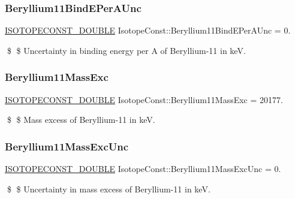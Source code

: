 \subsubsection{\texorpdfstring{Beryllium11\+Bind\+E\+Per\+A\+Unc}{Beryllium11BindEPerAUnc}}
{\footnotesize\ttfamily \mbox{\hyperlink{group___isotope_const-_macros_ga8f45a7272ce02c0b4c65c44636ed719a}{I\+S\+O\+T\+O\+P\+E\+C\+O\+N\+S\+T\+\_\+\+D\+O\+U\+B\+LE}} Isotope\+Const\+::\+Beryllium11\+Bind\+E\+Per\+A\+Unc = 0.}

\$ \$ Uncertainty in binding energy per A of Beryllium-\/11 in keV. \mbox{\label{group___isotope_const-_beryllium-_be11_ga4ae464d79a430e2e596828de55b8603c}} 
\subsubsection{\texorpdfstring{Beryllium11\+Mass\+Exc}{Beryllium11MassExc}}
{\footnotesize\ttfamily \mbox{\hyperlink{group___isotope_const-_macros_ga8f45a7272ce02c0b4c65c44636ed719a}{I\+S\+O\+T\+O\+P\+E\+C\+O\+N\+S\+T\+\_\+\+D\+O\+U\+B\+LE}} Isotope\+Const\+::\+Beryllium11\+Mass\+Exc = 20177.}

\$ \$ Mass excess of Beryllium-\/11 in keV. \mbox{\label{group___isotope_const-_beryllium-_be11_gacc6c04fcd3e468e9c9140ecff73e669d}} 
\subsubsection{\texorpdfstring{Beryllium11\+Mass\+Exc\+Unc}{Beryllium11MassExcUnc}}
{\footnotesize\ttfamily \mbox{\hyperlink{group___isotope_const-_macros_ga8f45a7272ce02c0b4c65c44636ed719a}{I\+S\+O\+T\+O\+P\+E\+C\+O\+N\+S\+T\+\_\+\+D\+O\+U\+B\+LE}} Isotope\+Const\+::\+Beryllium11\+Mass\+Exc\+Unc = 0.}

\$ \$ Uncertainty in mass excess of Beryllium-\/11 in keV. \mbox{\label{group___isotope_const-_beryllium-_be11_ga0300b8323aa3920563715ee6f845d0f6}} 
